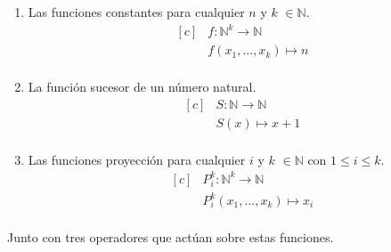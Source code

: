 \begin{enumerate}
  \item Las funciones constantes para cualquier $n$ y $k$ $\in \mathbb{N}$.
  \begin{equation*}
  \begin{aligned}[c]
  &f \colon \mathbb{N}^k \to \mathbb{N}\\
  &f(x_1,...,x_k) \mapsto n \\
  \end{aligned}
  \end{equation*}
  
  \item La función sucesor de un número natural.
  \begin{equation*}
  \begin{aligned}[c]
  &S \colon \mathbb{N} \to \mathbb{N}\\
  &S(x) \mapsto x + 1 \\
  \end{aligned}
  \end{equation*}
  
  \item Las funciones proyección para cualquier $i$ y $k$ $\in \mathbb{N}$ con $1 \leq i \leq k$.
  \begin{equation*}
  \begin{aligned}[c]
  &P_i^k \colon \mathbb{N}^k \to \mathbb{N}\\
  &P_i^k(x_1, ..., x_k) \mapsto x_i \\
  \end{aligned}
  \end{equation*}
  
\end{enumerate}

Junto con tres operadores que actúan sobre estas funciones.\\

